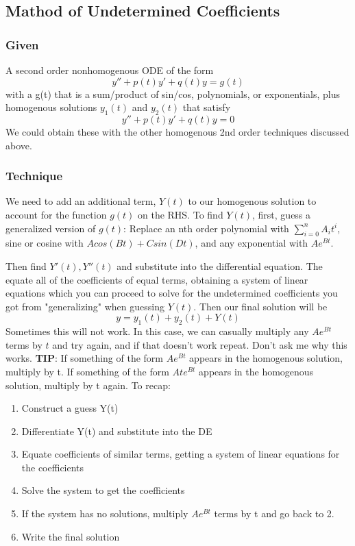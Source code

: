 \documentclass[11pt]{article}
\begin{document}
\subsection{Mathod of Undetermined Coefficients}
\subsubsection{Given}
A second order nonhomogenous ODE of the form
    \[ y'' + p(t)y' + q(t)y = g(t) \]
with a g(t) that is a sum/product of sin/cos, polynomials, or exponentials,
plus homogenous solutions $y_1(t)$ and $y_2(t)$ that satisfy
    \[ y'' + p(t)y' + q(t)y = 0 \]
We could obtain these with the other homogenous 2nd order techniques discussed above. 
\subsubsection{Technique}
We need to add an additional term, $Y(t)$ to our homogenous solution to account for the function $g(t)$
on the RHS. To find $Y(t)$, first, guess a generalized version of $g(t)$: Replace an nth order polynomial
with $\sum_{i=0}^n A_it^i$, sine or cosine with $Acos(Bt) + Csin(Dt)$, and any exponential with
$Ae^{Bt}$.

Then find $Y'(t), Y''(t)$ and substitute into the differential equation. The equate all of the coefficients
of equal terms, obtaining a system of linear equations which you can proceed to solve for the undetermined
coefficients you got from "generalizing" when guessing $Y(t)$. Then our final solution will be
    \[ y = y_1(t) + y_2(t) + Y(t) \]
Sometimes this will not work. In this case, we can casually multiply any $Ae^{Bt}$ terms by $t$ and try
again, and if that doesn't work repeat. Don't ask me why this works. \textbf{TIP}: If something of the 
form $Ae^{Bt}$ appears in the homogenous solution, multiply by t. If something of the form $Ate^{Bt}$ 
appears in the homogenous solution, multiply by t again. 
To recap:
\begin{enumerate}
    \item Construct a guess Y(t)
    \item Differentiate Y(t) and substitute into the DE
    \item Equate coefficients of similar terms, getting a system of linear equations for the coefficients
    \item Solve the system to get the coefficients
    \item If the system has no solutions, multiply $Ae^{Bt}$ terms by t and go back to 2.
    \item Write the final solution
\end{enumerate}
\end{document}

